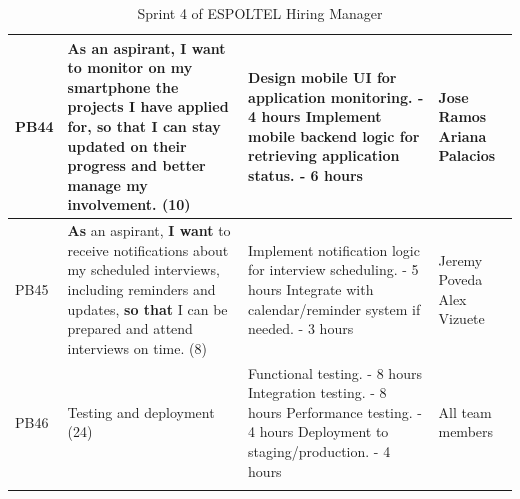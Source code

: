 \documentclass{scrreprt}
\begin{document}
\begin{longtable}{|p{1.5cm}|p{5.5cm}|p{4.5cm}|p{3cm}|}
	PB44 & \textbf{As} an aspirant, \textbf{I want} to monitor on my smartphone the projects I have applied for, \textbf{so that} I can stay updated on their progress and better manage my involvement. (10) &
	Design mobile UI for application monitoring. - 4 hours \newline
	Implement mobile backend logic for retrieving application status. - 6 hours &
	Jose Ramos \newline
	Ariana Palacios \\ \hline
	
	PB45 & \textbf{As} an aspirant, \textbf{I want} to receive notifications about my scheduled interviews, including reminders and updates, \textbf{so that} I can be prepared and attend interviews on time. (8) &
	Implement notification logic for interview scheduling. - 5 hours \newline
	Integrate with calendar/reminder system if needed. - 3 hours &
	Jeremy Poveda \newline
	Alex Vizuete \\ \hline
	
	PB46 & Testing and deployment (24) &
	Functional testing. - 8 hours \newline
	Integration testing. - 8 hours \newline
	Performance testing. - 4 hours \newline
	Deployment to staging/production. - 4 hours &
	All team members \\ \hline
	
	\caption{Sprint 4 of ESPOLTEL Hiring Manager}
\end{longtable}
\end{document}
